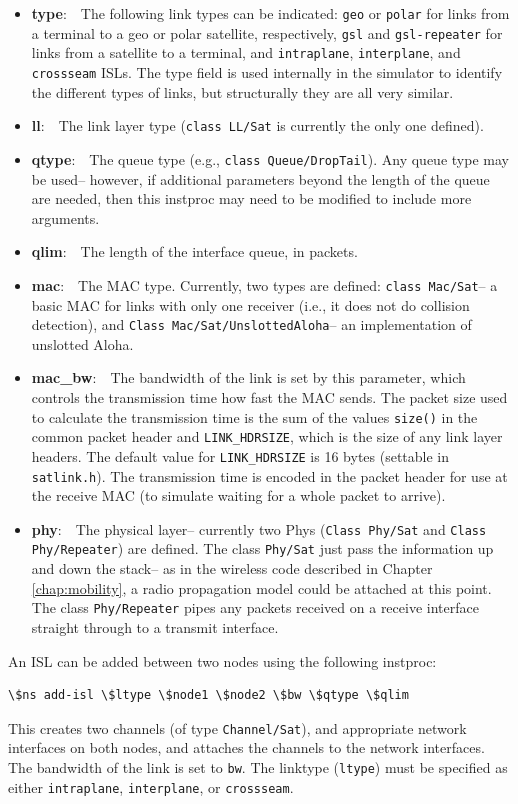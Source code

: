 \begin{itemize} 
	\item {\bf type}:~~The following link types can be indicated:  
{\tt geo} or 
{\tt polar} for links from a terminal to a geo or polar satellite, 
respectively, {\tt gsl} and {\tt gsl-repeater} for links from a satellite
to a terminal, and {\tt intraplane}, {\tt interplane}, and {\tt crossseam}
ISLs.  The type field is used internally in the simulator to identify the
different types of links, but structurally they are all very similar.
	\item {\bf ll}:~~The link layer type ({\tt class LL/Sat} is currently
the only one defined).  
	\item {\bf qtype}:~~The queue type (e.g., {\tt class Queue/DropTail}).
Any queue type may be used-- however, if additional parameters beyond the
length of the queue are needed, then this instproc may need to be modified
to include more arguments.
	\item {\bf qlim}:~~The length of the interface queue, in packets.
	\item {\bf mac}:~~The MAC type.  Currently, two types are defined:
{\tt class Mac/Sat}-- a basic MAC for links with only one receiver (i.e.,
it does not do collision detection), and
{\tt Class Mac/Sat/UnslottedAloha}-- an implementation of unslotted Aloha.
	\item {\bf mac\_bw}:~~The bandwidth of the link is set by this 
parameter, which controls the transmission time how fast the MAC sends. The
packet size used to calculate the transmission time is the sum of the
values {\tt size()} in the common packet header and {\tt LINK\_HDRSIZE},
which is the size of any link layer headers.  The default value for
{\tt LINK\_HDRSIZE} is 16 bytes (settable in {\tt satlink.h}).
The transmission time is encoded in the packet header for use at the
receive MAC (to simulate waiting for a whole packet to arrive).  
	\item {\bf phy}:~~The physical layer-- currently two Phys 
({\tt Class Phy/Sat} and {\tt Class Phy/Repeater}) are defined.  
The class {\tt Phy/Sat} just pass the information up and down the stack--
as in the wireless code described in Chapter \ref{chap:mobility}, 
a radio propagation model could be attached at this point.  The class
{\tt Phy/Repeater} pipes any packets received on a receive interface
straight through to a transmit interface.
\end{itemize}

An ISL can be added between two nodes using the following instproc:
\begin{verbatim}
\$ns add-isl \$ltype \$node1 \$node2 \$bw \$qtype \$qlim
\end{verbatim}
This creates two channels (of type {\tt Channel/Sat}), and appropriate
network interfaces on both nodes, and attaches the channels to the 
network interfaces.  The bandwidth of the link is
set to {\tt bw}.  The linktype ({\tt ltype})
must be specified as either {\tt intraplane}, {\tt interplane}, or 
{\tt crossseam}.


